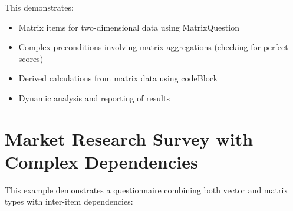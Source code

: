 This demonstrates:
\begin{itemize}
    \item Matrix items for two-dimensional data using MatrixQuestion
    \item Complex preconditions involving matrix aggregations (checking for perfect scores)
    \item Derived calculations from matrix data using codeBlock
    \item Dynamic analysis and reporting of results
\end{itemize}

\clearpage
\section{Market Research Survey with Complex Dependencies}

This example demonstrates a questionnaire combining both vector and matrix types with inter-item dependencies:

